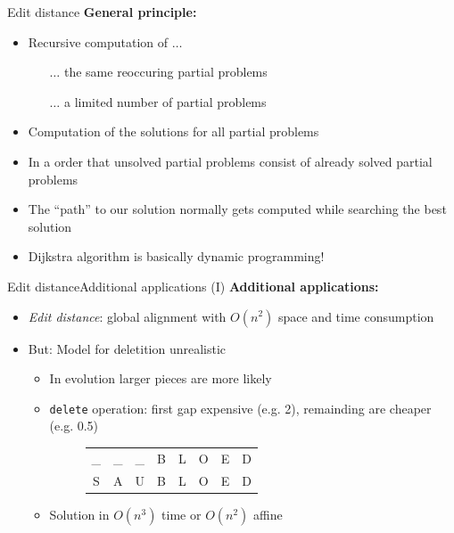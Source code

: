 \begin{frame}{Edit distance}
  \textbf{General principle:}
  \begin{itemize}
    \item<2->
      Recursive computation of $\ldots$
      \begin{itemize}
        \item[$\ldots$]
          the same reoccuring partial problems
        \item[$\ldots$]
          a limited number of partial problems
      \end{itemize}
    \item<3->
      Computation of the solutions for all partial problems
    \item<4->
      In a order that unsolved partial problems consist of already solved
      partial problems
    \item<5->
      The \enquote{path} to our solution normally gets computed while searching
      the best solution
    \item<5->
      Dijkstra algorithm is basically dynamic programming!
  \end{itemize}
\end{frame}


\begin{frame}{Edit distance}{Additional applications (I)}
  \textbf{Additional applications:}
  \begin{itemize}
    \item<2->
      \textit{Edit distance}: global alignment with $O(n^2)$ space and time
      consumption
    \item<3->
      But: Model for deletition unrealistic
      \begin{itemize}
        \item<4->
          In evolution larger pieces are more likely
        \item<5->
          \texttt{delete} operation: first gap expensive (e.g. 2),
          remainding are cheaper (e.g. 0.5)
          \begin{figure}[!h]
            \begin{tabular}{cccccccc}
              \_ & \_ & \_ & B & L & O & E & D\\
              S & A & U & B & L & O & E & D
            \end{tabular}
          \end{figure}
        \item<6->
          Solution in $O(n^3)$ time or $O(n^2)$ affine
      \end{itemize}
  \end{itemize}
\end{frame}

